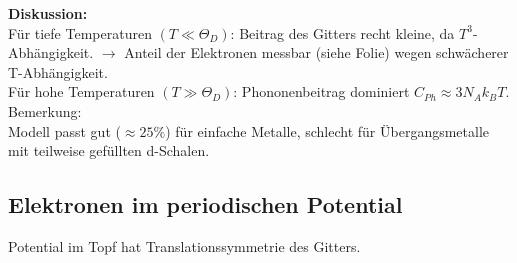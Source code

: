 \begin{itemize}
\textbf{Diskussion:} \\
Für tiefe Temperaturen $(T \ll \Theta_D)$: Beitrag des Gitters recht kleine, da $T^3$-Abhängigkeit. $\rightarrow$ Anteil der Elektronen messbar (siehe Folie) wegen schwächerer T-Abhängigkeit. \\
Für hohe Temperaturen $(T \gg \Theta_D)$: Phononenbeitrag dominiert $C_{Ph} \approx 3 N_A k_B T$. \\
Bemerkung: \\
Modell passt gut ($\approx 25 \%$) für einfache Metalle, schlecht für Übergangsmetalle mit teilweise gefüllten d-Schalen.

\end{itemize}

\subsection{Elektronen im periodischen Potential} \label{kap:5_2}
Potential im Topf hat Translationssymmetrie des Gitters.
